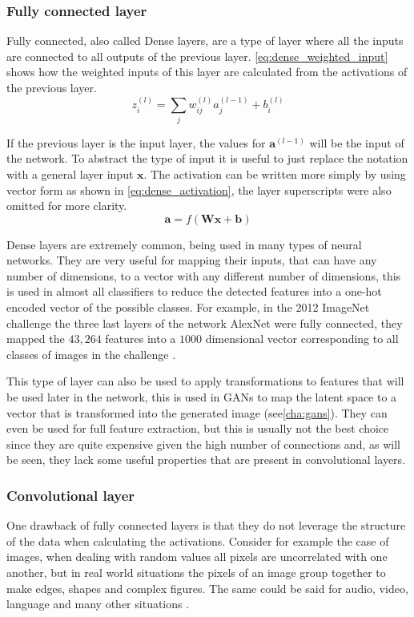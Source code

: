 \subsubsection{Fully connected layer} \label{subsub:fully_connected}
Fully connected, also called Dense layers, are a type of layer where all the inputs are connected to all outputs of the previous layer. \autoref{eq:dense_weighted_input} shows how the weighted inputs of this layer are calculated from the activations of the previous layer.
\begin{equation} \label{eq:dense_weighted_input}
    z_{i}^{(l)} = \sum_{j}{w_{ij}^{(l)} a_{j}^{(l-1)}} + b_i^{(l)}
\end{equation}

If the previous layer is the input layer, the values for $\bm{a}^{(l-1)}$ will be the input of the network. To abstract the type of input it is useful to just replace the notation with a general layer input $\bm{x}$. The activation can be written more simply by using vector form as shown in \autoref{eq:dense_activation}, the layer superscripts were also omitted for more clarity.
\begin{equation} \label{eq:dense_activation}
    \bm{a} = f\left( \bm{W}\bm{x} + \bm{b} \right)
\end{equation}

Dense layers are extremely common, being used in many types of neural networks. They are very useful for mapping their inputs, that can have any number of dimensions, to a vector with any different number of dimensions, this is used in almost all classifiers to reduce the detected features into a one-hot encoded vector of the possible classes. For example, in the 2012 ImageNet challenge the three last layers of the network AlexNet were fully connected, they mapped the $43,264$ features into a $1000$ dimensional vector corresponding to all classes of images in the challenge \cite{alexnet2012}.

This type of layer can also be used to apply transformations to features that will be used later in the network, this is used in \acp{GAN} to map the latent space to a vector that is transformed into the generated image (see\autoref{cha:gans}). They can even be used for full feature extraction, but this is usually not the best choice since they are quite expensive given the high number of connections and, as will be seen, they lack some useful properties that are present in convolutional layers.


\subsubsection{Convolutional layer}
One drawback of fully connected layers is that they do not leverage the structure of the data when calculating the activations. Consider for example the case of images, when dealing with random values all pixels are uncorrelated with one another, but in real world situations the pixels of an image group together to make edges, shapes and complex figures. The same could be said for audio, video, language and many other situations \cite{guide_conv2018}.

